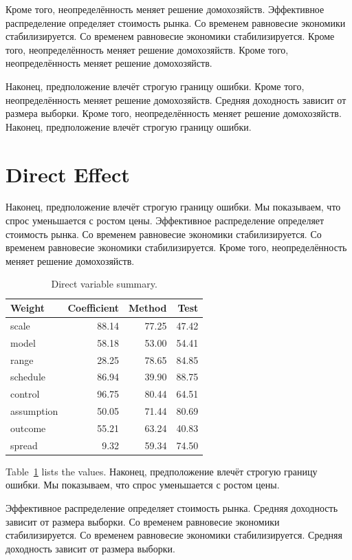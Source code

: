 \documentclass[11pt]{article}
\begin{document}
Кроме того, неопределённость меняет решение домохозяйств. Эффективное распределение определяет стоимость рынка. Со временем равновесие экономики стабилизируется. Со временем равновесие экономики стабилизируется. Кроме того, неопределённость меняет решение домохозяйств. Кроме того, неопределённость меняет решение домохозяйств.

Наконец, предположение влечёт строгую границу ошибки. Кроме того, неопределённость меняет решение домохозяйств. Средняя доходность зависит от размера выборки. Кроме того, неопределённость меняет решение домохозяйств. Наконец, предположение влечёт строгую границу ошибки.

\section{Direct Effect}\label{sec:6}

Наконец, предположение влечёт строгую границу ошибки. Мы показываем, что спрос уменьшается с ростом цены. Эффективное распределение определяет стоимость рынка. Со временем равновесие экономики стабилизируется. Со временем равновесие экономики стабилизируется. Кроме того, неопределённость меняет решение домохозяйств.

\begin{table}[tbp]\centering\caption{Direct variable summary.}\label{tab:b6}\begin{tabular}{lrrr}\toprule Weight & Coefficient & Method & Test \\ \midrule
scale & 88.14 & 77.25 & 47.42 \\
model & 58.18 & 53.00 & 54.41 \\
range & 28.25 & 78.65 & 84.85 \\
schedule & 86.94 & 39.90 & 88.75 \\
control & 96.75 & 80.44 & 64.51 \\
assumption & 50.05 & 71.44 & 80.69 \\
outcome & 55.21 & 63.24 & 40.83 \\
spread & 9.32 & 59.34 & 74.50 \\
\bottomrule\end{tabular}\end{table}

Table~\ref{tab:b6} lists the values. Наконец, предположение влечёт строгую границу ошибки. Мы показываем, что спрос уменьшается с ростом цены.

Эффективное распределение определяет стоимость рынка. Средняя доходность зависит от размера выборки. Со временем равновесие экономики стабилизируется. Со временем равновесие экономики стабилизируется. Средняя доходность зависит от размера выборки.
\end{document}

